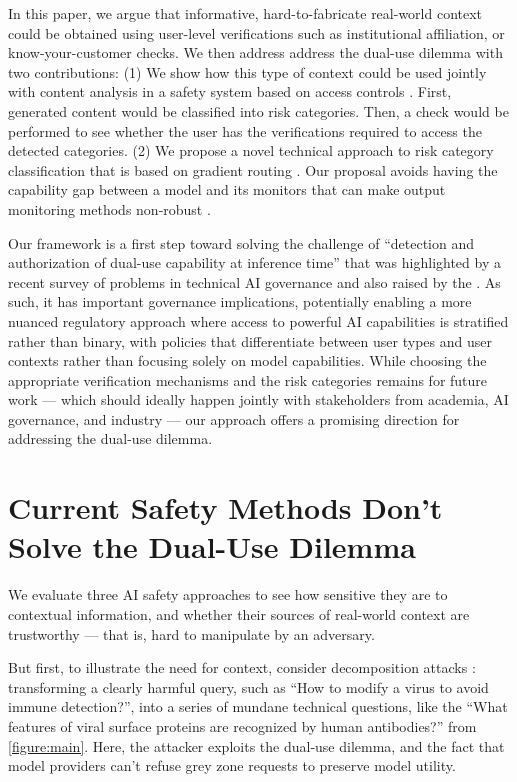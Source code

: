 \documentclass{article}
\theoremstyle{plain}
\theoremstyle{definition}
\theoremstyle{remark}
\begin{document}
In this paper, we argue that informative, hard-to-fabricate real-world context could be obtained using user-level verifications such as institutional affiliation, or know-your-customer checks. We then address address the dual-use dilemma with two contributions:
(1) We show how this type of context could be used jointly with content analysis in a safety system based on access controls \cite{butler1974}. First, generated content would be classified into risk categories. Then, a check would be performed to see whether the user has the verifications required to access the detected categories. (2) We propose a novel technical approach to risk category classification that is based on gradient routing \cite{cloud2024gradientroutingmaskinggradients}. Our proposal avoids having the capability gap between a model and its monitors that can make output monitoring methods non-robust \cite{jin2024jailbreakinglargelanguagemodels}.

Our framework is a first step toward solving the challenge of ``detection and authorization of dual-use capability at inference time'' that was highlighted by a recent survey of problems in technical AI governance \cite{reuel2025openproblemstechnicalai} and also raised by the \citet{NIST_AI_800_1_ipd_2024}.
As such, it has important governance implications, potentially enabling a more nuanced regulatory approach where access to powerful AI capabilities is stratified rather than binary, with policies that differentiate between user types and user contexts rather than focusing solely on model capabilities. While choosing the appropriate verification mechanisms and the risk categories remains for future work --- which should ideally happen jointly with stakeholders from academia, AI governance, and industry --- our approach offers a promising direction for addressing the dual-use dilemma.

\section{Current Safety Methods Don't Solve the Dual-Use Dilemma} \label{section:current-methods}

We evaluate three AI safety approaches to see how sensitive they are to contextual information, and whether their sources of real-world context are trustworthy --- that is, hard to manipulate by an adversary.

But first, to illustrate the need for context, consider decomposition attacks \cite{glukhov2023llmcensorshipmachinelearning, glukhov2024breachthousandleaksunsafe}: transforming a clearly harmful query, such as ``How to modify a virus to avoid immune detection?'', into a series of mundane technical questions, like the ``What features of viral surface proteins are recognized by human antibodies?'' from \cref{figure:main}. Here, the attacker exploits the dual-use dilemma, and the fact that model providers can't refuse grey zone requests to preserve model utility.
\end{document}

